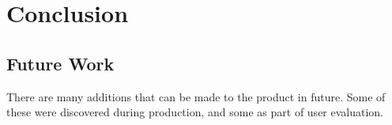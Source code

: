 \chapter{Conclusion}




\section{Future Work}

There are many additions that can be made to the product in future. Some of these were discovered during production, and some as part of user evaluation.

